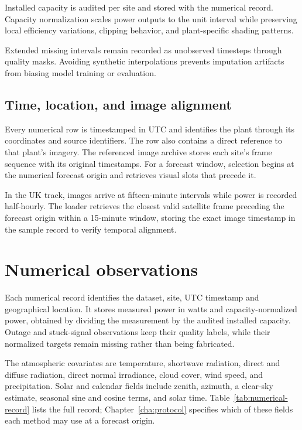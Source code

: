 Installed capacity is audited per site and stored with the numerical record. Capacity normalization scales power outputs to the unit interval while preserving local efficiency variations, clipping behavior, and plant-specific shading patterns.

Extended missing intervals remain recorded as unobserved timesteps through quality masks. Avoiding synthetic interpolations prevents imputation artifacts from biasing model training or evaluation.

\subsection{Time, location, and image alignment}

Every numerical row is timestamped in UTC and identifies the plant through its coordinates and source identifiers. The row also contains a direct reference to that plant's imagery. The referenced image archive stores each site's frame sequence with its original timestamps. For a forecast window, selection begins at the numerical forecast origin and retrieves visual slots that precede it.

In the UK track, images arrive at fifteen-minute intervals while power is recorded half-hourly. The loader retrieves the closest valid satellite frame preceding the forecast origin within a 15-minute window, storing the exact image timestamp in the sample record to verify temporal alignment.

\section{Numerical observations}

Each numerical record identifies the dataset, site, UTC timestamp and geographical location. It stores measured power in watts and capacity-normalized power, obtained by dividing the measurement by the audited installed capacity. Outage and stuck-signal observations keep their quality labels, while their normalized targets remain missing rather than being fabricated.

The atmospheric covariates are temperature, shortwave radiation, direct and diffuse radiation, direct normal irradiance, cloud cover, wind speed, and precipitation. Solar and calendar fields include zenith, azimuth, a clear-sky estimate, seasonal sine and cosine terms, and solar time. Table~\ref{tab:numerical-record} lists the full record; Chapter~\ref{cha:protocol} specifies which of these fields each method may use at a forecast origin.

